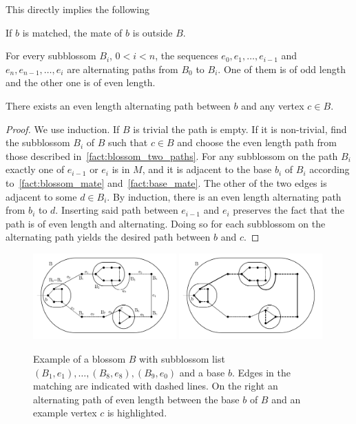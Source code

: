 This directly implies the following

\begin{fact}\label{fact:base_mate}
    If $b$ is matched, the mate of $b$ is outside $B$.
\end{fact}

\begin{fact}\label{fact:blossom_two_paths}
    For every subblossom $B_i$, $0 < i < n$, the sequences $e_0, e_1, \dots, e_{i-1}$ and $e_n, e_{n-1}, \dots, e_i$ are alternating paths from $B_0$ to $B_i$. One of them is of odd length and the other one is of even length.
\end{fact}

\begin{fact}
    There exists an even length alternating path between $b$ and any vertex $c \in B$.

\begin{proof}
    We use induction. If $B$ is trivial the path is empty. If it is non-trivial, find the subblossom $B_i$ of $B$ such that $c \in B$ and choose the even length path from those described in~\ref{fact:blossom_two_paths}. For any subblossom on the path $B_i$ exactly one of $e_{i-1}$ or $e_{i}$ is in $M$, and it is adjacent to the base $b_i$ of $B_i$ according to~\ref{fact:blossom_mate} and~\ref{fact:base_mate}. The other of the two edges is adjacent to some $d \in B_i$. By induction, there is an even length alternating path from $b_i$ to $d$. Inserting said path between $e_{i-1}$ and $e_i$ preserves the fact that the path is of even length and alternating. Doing so for each subblossom on the alternating path yields the desired path between $b$ and $c$.
\end{proof}
\end{fact}

\begin{figure}
    \centering
    \includegraphics*[width=0.49\textwidth]{figures/Basic Blossom.png}
    \includegraphics*[width=0.49\textwidth]{figures/Blossom alternating clean.png}
    \caption{Example of a blossom $B$ with subblossom list $(B_1, e_1), \dots, (B_8, e_8), (B_9, e_0)$ and a base $b$. Edges in the matching are indicated with dashed lines. On the right an alternating path of even length between the base $b$ of $B$ and an example vertex $c$ is highlighted.}\label{fig:odd_expansion}
\end{figure}

